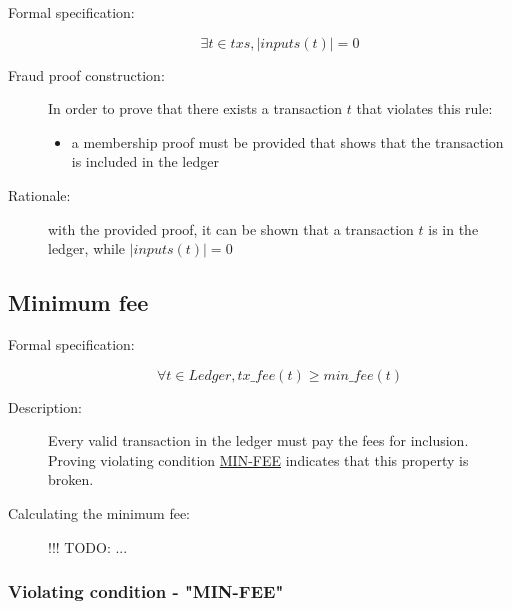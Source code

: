 \documentclass[../main.tex]{subfiles}
\begin{document}
\begin{description}

\item[Formal specification:]
\begin{equation*}
    \exists t \in txs, |inputs(t)| = 0
\end{equation*}

\item[Fraud proof construction:] In order to prove that there exists a transaction $t$ that violates this rule:
\begin{itemize}
    \item a membership proof must be provided that shows that the transaction is included in the ledger
\end{itemize}

\item[Rationale:] with the provided proof, it can be shown that a transaction $t$ is in the ledger, while $|inputs(t)| = 0$

\end{description}

\subsection{Minimum fee}

\begin{description}

\item[Formal specification:]
\begin{equation*}
    \forall t \in Ledger, tx\_fee(t) \geq min\_fee(t)
\end{equation*}

\item[Description:] Every valid transaction in the ledger must pay the fees for inclusion. Proving violating condition \hyperref[sec:MIN-FEE]{MIN-FEE} indicates that this property is broken.

\item[Calculating the minimum fee:] !!! TODO: ...

\end{description}

\subsubsection{Violating condition - "MIN-FEE"}
\label{sec:MIN-FEE}
\end{document}

